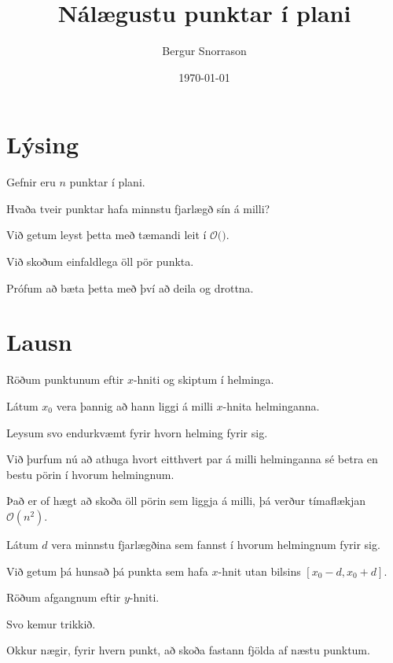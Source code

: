 \title{Nálægustu punktar í plani}
\author{Bergur Snorrason}
\date{\today}



\frame{\titlepage}

\section{Lýsing}
{
    {
        \item<1-> Gefnir eru $n$ punktar í plani.
        \item<2-> Hvaða tveir punktar hafa minnstu fjarlægð sín á milli?
        \item<3-> Við getum leyst þetta með tæmandi leit í $\mathcal{O}($$)$.
        \item<5-> Við skoðum einfaldlega öll pör punkta.
        \item<6-> Prófum að bæta þetta með því að deila og drottna.
    }
}

\section{Lausn}
{
    {
        \item<1-> Röðum punktunum eftir $x$-hniti og skiptum í helminga.
        \item<2-> Látum $x_0$ vera þannig að hann liggi á milli $x$-hnita helminganna.
        \item<3-> Leysum svo endurkvæmt fyrir hvorn helming fyrir sig.
        \item<4-> Við þurfum nú að athuga hvort eitthvert par á milli helminganna sé betra en
                    bestu pörin í hvorum helmingnum.
        \item<5-> Það er of hægt að skoða öll pörin sem liggja á milli, þá verður tímaflækjan $\mathcal{O}(n^2)$.
        \item<6-> Látum $d$ vera minnstu fjarlægðina sem fannst í hvorum helmingnum fyrir sig.
        \item<7-> Við getum þá hunsað þá punkta sem hafa $x$-hnit utan bilsins $[x_0 - d, x_0 + d]$.
        \item<8-> Röðum afgangnum eftir $y$-hniti.
        \item<9-> Svo kemur trikkið.
        \item<10-> Okkur nægir, fyrir hvern punkt, að skoða fastann fjölda af næstu punktum.
    }
}

